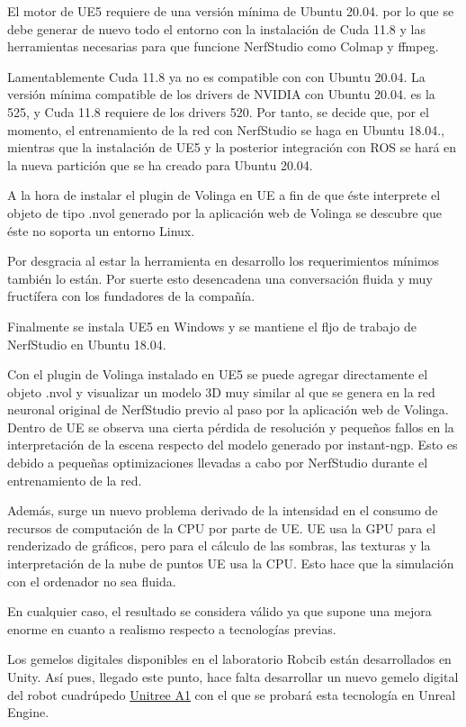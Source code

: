 \documentclass[a4paper, 12pt, spanish, twoside]{article}
\begin{document}
El motor de UE5 requiere de una versión mínima de Ubuntu 20.04. por lo que se debe generar de nuevo todo el entorno con la instalación de Cuda 11.8 y las herramientas necesarias para que funcione NerfStudio como Colmap y ffmpeg. 

Lamentablemente Cuda 11.8 ya no es compatible con con Ubuntu 20.04. La versión mínima compatible de los drivers de NVIDIA con Ubuntu 20.04. es la 525, y Cuda 11.8 requiere de los drivers 520. Por tanto, se decide que, por el momento, el entrenamiento de la red con NerfStudio se haga en Ubuntu 18.04., mientras que la instalación de UE5 y la posterior integración con ROS se hará en la nueva partición que se ha creado para Ubuntu 20.04. 

A la hora de instalar el plugin de Volinga en UE a fin de que éste interprete el objeto de tipo .nvol generado por la aplicación web de Volinga se descubre que éste no soporta un entorno Linux.  

Por desgracia al estar la herramienta en desarrollo los requerimientos mínimos también lo están. Por suerte esto desencadena una conversación fluida y muy fructífera con los fundadores de la compañía. 

Finalmente se instala UE5 en Windows y se mantiene el fljo de trabajo de NerfStudio en Ubuntu 18.04. 

Con el plugin de Volinga instalado en UE5 se puede agregar directamente el objeto .nvol y visualizar un modelo 3D muy similar al que se genera en la red neuronal original de NerfStudio previo al paso por la aplicación web de Volinga. Dentro de UE se observa una cierta pérdida de resolución y pequeños fallos en la interpretación de la escena respecto del modelo generado por instant-ngp. Esto es debido a pequeñas optimizaciones llevadas a cabo por NerfStudio durante el entrenamiento de la red.  

Además, surge un nuevo problema derivado de la intensidad en el consumo de recursos de computación de la CPU por parte de UE. UE usa la GPU para el renderizado de gráficos, pero para el cálculo de las sombras, las texturas y la interpretación de la nube de puntos UE usa la CPU. Esto hace que la simulación con el ordenador no sea fluida. 

En cualquier caso, el resultado se considera válido ya que supone una mejora enorme en cuanto a realismo respecto a tecnologías previas. 


Los gemelos digitales disponibles en el laboratorio Robcib están desarrollados en Unity. Así pues, llegado este punto, hace falta desarrollar un nuevo gemelo digital del robot cuadrúpedo \href{https://www.unitree.com/a1/}{Unitree A1} con el que se probará esta tecnología en Unreal Engine. 
\end{document}
